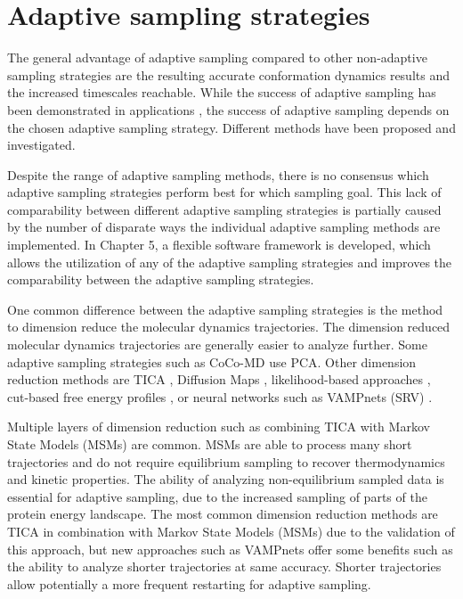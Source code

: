 \section{\label{sec:intro2}Adaptive sampling strategies}
The general advantage of adaptive sampling compared to other non-adaptive sampling strategies are the resulting accurate conformation dynamics results and the increased timescales reachable. While the success of adaptive sampling has been demonstrated in applications \cite{Wieczorek2016,Plattner20171005,Kohlhoff201415}, the success of adaptive sampling depends on the chosen adaptive sampling strategy. Different methods have been proposed and investigated\cite{Fabritiis-2014,
AdaptivePELE-Lecina2017, preto2014fast, doerr2016htmd,
weexplore, prattWESTPAAdvancesSampling2018, Adstrategies2018, FUNN, FAST, harada2015jctc, singhal2005error, bowman2010enhanced,
weber2011characterization,  EvolutionCoupling-Shamsi2017, FAST-Bowman-2015, 
Strategies-erros-reduce, plattner2017complete, WESTPA-Zwier2015}. 

Despite the range of adaptive sampling methods, there is no consensus which adaptive sampling strategies perform best for which sampling goal. This lack of comparability between different adaptive sampling strategies is partially caused by the number of disparate ways the individual adaptive sampling methods are implemented. In Chapter 5, a flexible software framework is developed, which allows the utilization of any of the adaptive sampling strategies and improves the comparability between the adaptive sampling strategies.

One common difference between the adaptive sampling strategies is the method to dimension reduce the molecular dynamics trajectories. The dimension reduced molecular dynamics trajectories are generally easier to analyze further.
Some adaptive sampling strategies such as CoCo-MD\cite{shkurti2019jctc,harada2015jctc,harada2017jctc} use PCA. Other dimension reduction methods are TICA\cite{TICA1-perez2013, TICA2-schwantes2013}
, Diffusion Maps \cite{Coifman7426, rohrdanz2011determination,Zheng2011, Boninsegna2015},
likelihood-based approaches \cite{peters2006obtaining}, cut-based free energy
profiles \cite{krivov2008diffusive}, or neural networks such as VAMPnets (SRV)
\cite{Mardt2018,wehmeyer2018time, ribeiro2018reweighted, chen2019jcp}. 

Multiple layers of dimension reduction such as combining TICA with Markov State Models (MSMs) \cite{prinz2011markov,
MSM-Pande-2018,bookmsm,masterequationsMSM,SCHUTTE1999146} are common. MSMs are able to process many short trajectories and
do not require equilibrium sampling to recover thermodynamics and kinetic properties. The ability of analyzing non-equilibrium sampled data is essential for adaptive sampling, due to the increased sampling of parts of the protein energy landscape. The most common dimension reduction methods are TICA in combination with Markov State Models (MSMs) due to the validation of this approach, but new approaches such as VAMPnets offer some benefits such as the ability to analyze shorter trajectories at same accuracy. Shorter trajectories allow potentially a more frequent restarting for adaptive sampling.

